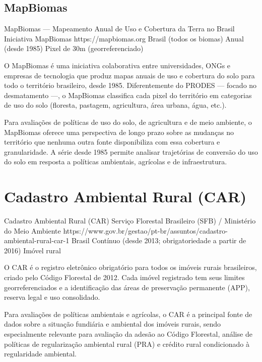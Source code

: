 \subsection{MapBiomas}

\ficharapida
  {MapBiomas --- Mapeamento Anual de Uso e Cobertura da Terra no Brasil}
  {Iniciativa MapBiomas}
  {https://mapbiomas.org}
  {Brasil (todos os biomas)}
  {Anual (desde 1985)}
  {Pixel de 30m (georreferenciado)}

O MapBiomas é uma iniciativa colaborativa entre universidades, ONGs e empresas de tecnologia que produz mapas anuais de uso e cobertura do solo para todo o território brasileiro, desde 1985. Diferentemente do PRODES --- focado no desmatamento ---, o MapBiomas classifica cada pixel do território em categorias de uso do solo (floresta, pastagem, agricultura, área urbana, água, etc.).

Para avaliações de políticas de uso do solo, de agricultura e de meio ambiente, o MapBiomas oferece uma perspectiva de longo prazo sobre as mudanças no território que nenhuma outra fonte disponibiliza com essa cobertura e granularidade. A série desde 1985 permite analisar trajetórias de conversão do uso do solo em resposta a políticas ambientais, agrícolas e de infraestrutura.

\section{Cadastro Ambiental Rural (CAR)}

\ficharapida
  {Cadastro Ambiental Rural (CAR)}
  {Serviço Florestal Brasileiro (SFB) / Ministério do Meio Ambiente}
  {https://www.gov.br/gestao/pt-br/assuntos/cadastro-ambiental-rural-car-1}
  {Brasil}
  {Contínuo (desde 2013; obrigatoriedade a partir de 2016)}
  {Imóvel rural}

O CAR é o registro eletrônico obrigatório para todos os imóveis rurais brasileiros, criado pelo Código Florestal de 2012. Cada imóvel registrado tem seus limites georreferenciados e a identificação das áreas de preservação permanente (APP), reserva legal e uso consolidado.

Para avaliações de políticas ambientais e agrícolas, o CAR é a principal fonte de dados sobre a situação fundiária e ambiental dos imóveis rurais, sendo especialmente relevante para avaliação da adesão ao Código Florestal, análise de políticas de regularização ambiental rural (PRA) e crédito rural condicionado à regularidade ambiental.

